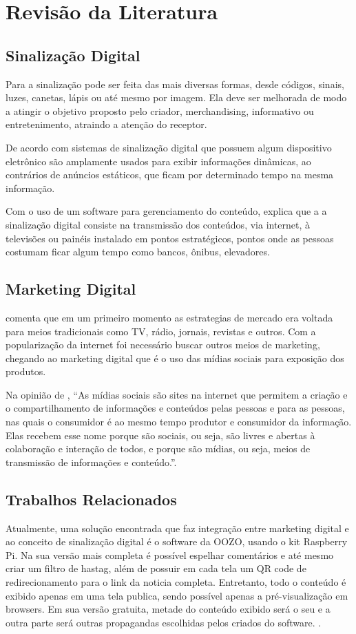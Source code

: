 \documentclass[
	12pt,				%
	openright,			%
	oneside,			%
	a4paper,			%
	english,			%
	french,				%
	spanish,			%
	brazil,				%
	]{abntex2}
\begin{document}
\section*{Revisão da Literatura}
	

	\subsection*{Sinalização Digital}
	Para \cite{munari2006} a sinalização pode ser feita das mais diversas formas, desde códigos, sinais, luzes, canetas, lápis ou até mesmo por imagem. Ela deve ser melhorada de modo a  atingir o objetivo proposto pelo criador, merchandising, informativo ou entretenimento, atraindo a atenção do receptor. 
	
	De acordo com \cite{mishima2016} sistemas de sinalização digital que possuem algum dispositivo eletrônico são amplamente usados para exibir informações dinâmicas, ao contrários de anúncios estáticos, que ficam por determinado tempo na mesma informação. 
	
	Com o uso de um software para gerenciamento do conteúdo, \cite{machado2010} explica que a a sinalização digital consiste na transmissão dos conteúdos, via internet, à televisões ou painéis instalado em pontos estratégicos, pontos onde as pessoas costumam ficar algum tempo como bancos, ônibus, elevadores.
	
	\subsection*{Marketing Digital}
	\cite{santos2014} comenta que em um primeiro momento as estrategias de mercado era voltada para meios tradicionais como TV, rádio, jornais, revistas e outros. Com a popularização da internet foi necessário buscar outros meios de marketing, chegando ao marketing digital que é o uso das mídias sociais para exposição dos produtos.
	
	Na opinião de \cite{torres2000}, ``As mídias sociais são sites na internet que permitem a criação e o compartilhamento de informações e conteúdos pelas pessoas e para as pessoas, nas quais o consumidor é ao mesmo tempo produtor e consumidor da informação. Elas recebem esse nome porque são sociais, ou seja, são livres e abertas à colaboração e interação de todos, e porque são mídias, ou seja, meios de transmissão de informações e conteúdo.''. 
	
	\subsection*{Trabalhos Relacionados}
	Atualmente, uma solução encontrada que faz integração entre marketing digital e ao conceito de sinalização digital é o software da OOZO, usando o kit Raspberry Pi. Na sua versão mais completa é possível espelhar comentários e até mesmo criar um filtro de hastag, além de possuir em cada tela um QR code de redirecionamento para o link da noticia completa. Entretanto, todo o conteúdo é exibido apenas em uma tela publica, sendo possível apenas a pré-visualização em browsers. Em sua versão gratuita, metade do conteúdo exibido será o seu e a outra parte será outras propagandas escolhidas pelos criados do software. \cite{oozo2017}.
	
\end{document}

